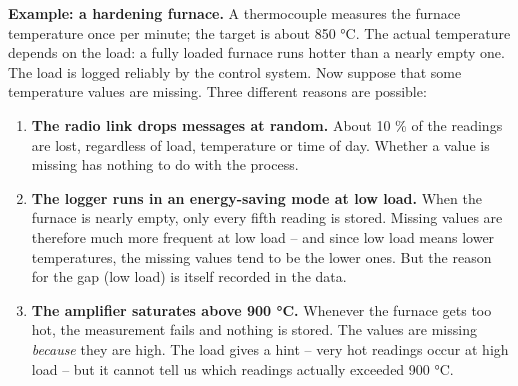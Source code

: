 \documentclass[
  letterpaper,
  DIV=11,
  numbers=noendperiod]{scrreprt}
\providecommand{\tightlist}{%
  \setlength{\itemsep}{0pt}\setlength{\parskip}{0pt}}\usepackage{longtable,booktabs,array}
\begin{document}
\textbf{Example: a hardening furnace.} A thermocouple measures the
furnace temperature once per minute; the target is about 850 °C. The
actual temperature depends on the load: a fully loaded furnace runs
hotter than a nearly empty one. The load is logged reliably by the
control system. Now suppose that some temperature values are missing.
Three different reasons are possible:

\begin{enumerate}
\def\labelenumi{\arabic{enumi}.}
\tightlist
\item
  \textbf{The radio link drops messages at random.} About 10 \% of the
  readings are lost, regardless of load, temperature or time of day.
  Whether a value is missing has nothing to do with the process.
\item
  \textbf{The logger runs in an energy-saving mode at low load.} When
  the furnace is nearly empty, only every fifth reading is stored.
  Missing values are therefore much more frequent at low load -- and
  since low load means lower temperatures, the missing values tend to be
  the lower ones. But the reason for the gap (low load) is itself
  recorded in the data.
\item
  \textbf{The amplifier saturates above 900 °C.} Whenever the furnace
  gets too hot, the measurement fails and nothing is stored. The values
  are missing \emph{because} they are high. The load gives a hint --
  very hot readings occur at high load -- but it cannot tell us which
  readings actually exceeded 900 °C.
\end{enumerate}
\end{document}
